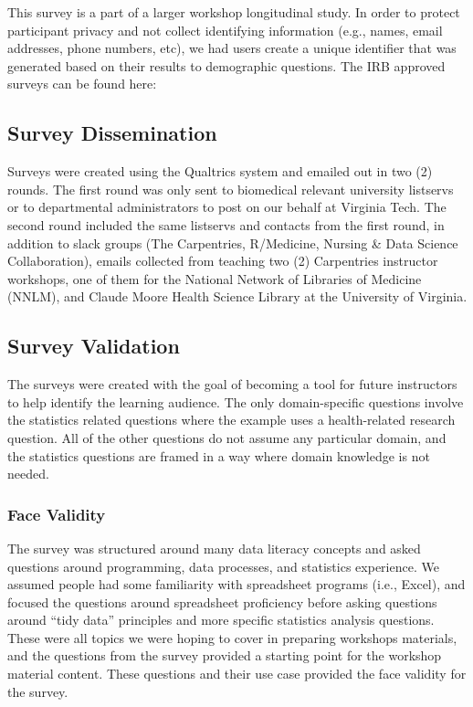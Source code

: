 \documentclass[020-persona\_validation.tex]{subfiles}
\begin{document}
        This survey is a part of a larger workshop longitudinal study.
        In order to protect participant privacy and not collect identifying information
        (e.g., names, email addresses, phone numbers, etc),
        we had users create a unique identifier that was generated based on their results to demographic questions.
        The IRB approved surveys can be found here:

    \subsection{Survey Dissemination}

        Surveys were created using the Qualtrics system and emailed out in two (2) rounds.
        The first round was only sent to biomedical relevant university listservs
        or to departmental administrators to post on our behalf at Virginia Tech.
        The second round included the same listservs and contacts from the first round,
        in addition to slack groups (The Carpentries, R/Medicine, Nursing \& Data Science Collaboration),
        emails collected from teaching two (2) Carpentries instructor workshops,
        one of them for the National Network of Libraries of Medicine (NNLM),
        and
        Claude Moore Health Science Library at the University of Virginia.

    \subsection{Survey Validation}

        The surveys were created with the goal of becoming a tool for future instructors
        to help identify the learning audience.
        The only domain-specific questions involve the statistics related questions
        where the example uses a health-related research question.
        All of the other questions do not assume any particular domain,
        and the statistics questions are framed in a way where domain knowledge is not needed.

    \subsubsection{Face Validity}

       The survey was structured around many data literacy concepts and asked questions around
        programming, data processes, and statistics experience.
        We assumed people had some familiarity with spreadsheet programs (i.e., Excel),
        and focused the questions around spreadsheet proficiency before asking questions
        around ``tidy data'' principles and more specific statistics analysis questions.
        These were all topics we were hoping to cover in preparing workshops materials,
        and the questions from the survey provided a starting point for the workshop material content.
        These questions and their use case provided the face validity for the survey.
\end{document}
